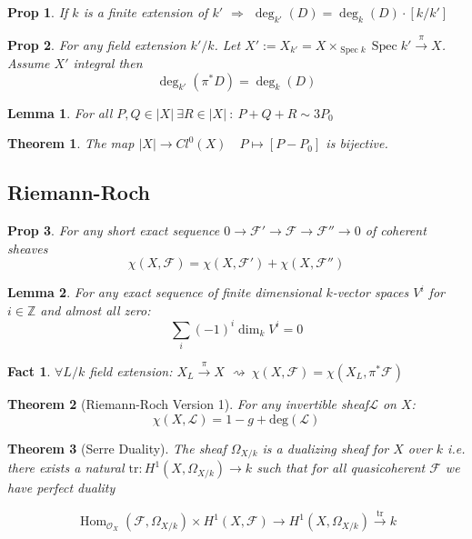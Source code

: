 \documentclass[a4paper, 12pt]{article}
\newcommand{\ca}[1]{\mathcal{#1}}
\newcommand{\caf}{\mathcal{F}}
\newcommand{\ox}{\mathcal{O}_X}
\newcommand{\bbz}{\mathbb{Z}}
\newtheorem*{prop}{Prop}
\newtheorem*{lem}{Lemma}
\newtheorem*{fact}{Fact}
\newtheorem*{thm}{Theorem}
\DeclareMathOperator{\spec}{Spec}
\DeclareMathOperator{\Hom}{Hom}
\begin{document}
	\begin{prop}
		If $ k $ is a finite extension of $ k' $ $ \Rightarrow $ $ \deg_{k'}(D) = \deg_k(D)\cdot [k/k'] $
	\end{prop}
	
	\begin{prop}
		For any field extension $ k'/k $. Let $ X' := X_{k'} = X \times_{\spec k} \spec k' \xrightarrow{\pi} X $. Assume $ X' $ integral then
		\[ \deg_{k'} (\pi^* D) = \deg_k (D) \]
	\end{prop}
	
	\begin{lem}
		For all $ P,Q \in |X| \: \exists R\in |X| \: :\: P+Q+R \sim 3P_0 $ 
	\end{lem}

        
        \begin{thm}
	        The map $ |X| \rightarrow Cl^0(X) \quad P \mapsto [P - P_0] $ is bijective.        
        \end{thm}
        
        
        
	\subsection{Riemann-Roch}
	
	\begin{prop}
		For any short exact sequence $ 0 \rightarrow \caf' \rightarrow \caf \rightarrow \caf'' \rightarrow 0 $ of coherent sheaves \[ \chi(X, \caf) = \chi(X, \caf') + \chi(X, \caf'') \]
	\end{prop}
	
	\begin{lem}
		For any exact sequence of finite dimensional $ k $-vector spaces $ V^i  $ for $ i \in \bbz $ and almost all zero:
		\[ \sum_i (-1)^i \dim_k V^i =0 \]
	\end{lem}
	
	\begin{fact}
		$ \forall L/k $ field extension: $ X_L \xrightarrow{\pi} X $
		$ \rightsquigarrow \: \chi(X, \caf) = \chi (X_L, \pi^* \caf) $
	\end{fact}
	
	\begin{thm}[Riemann-Roch Version 1]
		For any invertible sheaf$ \ca{L} $ on $ X $:
		\[ \chi(X,\ca{L}) = 1 - g + \mathrm{deg}(\ca{L}) \]
	\end{thm}
	
	\begin{thm}[Serre Duality]
		The sheaf $ \Omega_{X/k} $ is a dualizing sheaf for $ X $ over $ k $ i.e. there exists a natural $ \mathrm{tr}: H^1(X,\Omega_{X/k}) \rightarrow k $ such that for all quasicoherent $ \caf $ we have perfect duality
		
		\[ \Hom_{\ox}(\caf, \Omega_{X/k}) \times H^1(X,\caf) \longrightarrow H^1(X, \Omega_{X/k}) \xrightarrow{\mathrm{tr}} k \]
	\end{thm}
	
\end{document}
